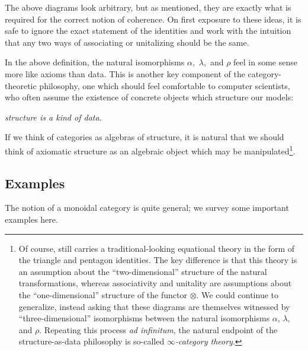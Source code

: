 The above diagrams look arbitrary, but as mentioned, they are exactly what is
required for the correct notion of coherence. On first exposure to these ideas,
it is safe to ignore the exact statement of the identities and work with the
intuition that any two ways of associating or unitalizing should be the same.

In the above definition, the natural isomorphisms $\alpha,$ $\lambda,$ and
$\rho$ feel in some sense more like axioms than data. This is another key
component of the category-theoretic philosophy, one which should feel
comfortable to computer scientists, who often assume the existence of concrete
objects which structure our models:\begin{center}
  \emph{
    structure is a kind of data.
  }
\end{center}
If we think of categories as algebras of structure, it is natural that we should
think of axiomatic structure as an algebraic object which may be
manipulated\footnote{
  Of course, 
  still carries a traditional-looking equational theory in the form of the
  triangle and pentagon identities. The key difference is that this theory is an
  assumption about the ``two-dimensional'' structure of the natural
  transformations, whereas associativity and unitality are assumptions about the
  ``one-dimensional'' structure of the functor $\otimes$. We could continue to
  generalize, instead asking that these diagrams are themselves witnessed by
  ``three-dimensional'' isomorphisms between the natural isomorphisms $\alpha$,
  $\lambda$, and $\rho$. Repeating this process \emph{ad infinitum}, the natural
  endpoint of the structure-as-data philosophy is so-called
  \emph{$\infty$-category theory}.
}.

\subsection{Examples}

The notion of a monoidal category is quite general; we survey some important
examples here.

